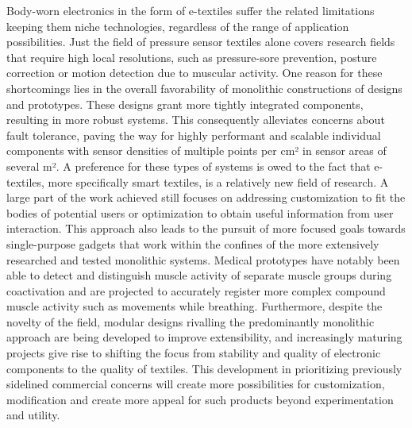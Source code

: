 \documentclass{sigchi}
\begin{document}
Body-worn electronics in the form of e-textiles suffer the related limitations keeping them niche technologies, regardless of the range of application possibilities. Just the field of pressure sensor textiles alone covers research fields that require high local resolutions, such as pressure-sore prevention, posture correction \cite{smart-rehabilitation} or motion detection due to muscular activity. \cite{vogel5}
One reason for these shortcomings lies in the overall favorability of monolithic constructions of designs and prototypes. These designs grant more tightly integrated components, resulting in more robust systems. This consequently alleviates concerns about fault tolerance, paving the way for highly performant and scalable individual components with sensor densities of multiple points per cm² in sensor areas of several m².\cite{vogel4}  A preference for these  types of systems is owed to the fact that e-textiles, more specifically smart textiles, is a relatively new field of research. \cite{simpleskin} A large part of the work achieved still focuses on addressing customization to fit the bodies of potential users or optimization to obtain useful information from user interaction. \cite{smart-rehabilitation} This approach also leads to the pursuit of more focused goals towards single-purpose gadgets that work within the confines of the more extensively researched and tested monolithic systems. Medical prototypes have notably been able to detect and distinguish muscle activity of separate muscle groups during coactivation and are projected to accurately register more complex compound muscle activity such as movements while breathing.\cite{vogel5} Furthermore, despite the novelty of the field, modular designs rivalling the predominantly monolithic approach are being developed to improve extensibility, and increasingly maturing projects give rise to shifting the focus from stability and quality of electronic components to the quality of textiles. This development in prioritizing previously sidelined commercial concerns will create more possibilities for customization, modification and create more appeal for such products beyond experimentation and utility. \cite{simpleskin, vogel4,niche-mainstream} %
\end{document}
